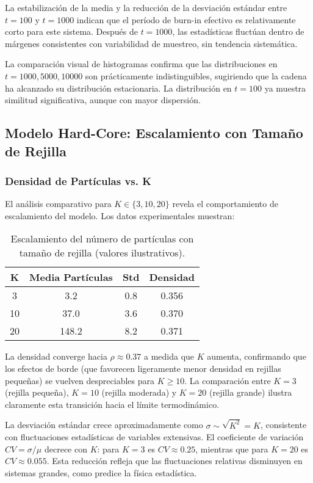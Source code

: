 La estabilización de la media y la reducción de la desviación estándar entre $t=100$ y $t=1000$ indican que el período de burn-in efectivo es relativamente corto para este sistema. Después de $t=1000$, las estadísticas fluctúan dentro de márgenes consistentes con variabilidad de muestreo, sin tendencia sistemática.

La comparación visual de histogramas confirma que las distribuciones en $t=1000, 5000, 10000$ son prácticamente indistinguibles, sugiriendo que la cadena ha alcanzado su distribución estacionaria. La distribución en $t=100$ ya muestra similitud significativa, aunque con mayor dispersión.

\subsection{Modelo Hard-Core: Escalamiento con Tamaño de Rejilla}

\subsubsection{Densidad de Partículas vs. K}

El análisis comparativo para $K \in \{3, 10, 20\}$ revela el comportamiento de escalamiento del modelo. Los datos experimentales muestran:

\begin{table}[h]
\centering
\begin{tabular}{|c|c|c|c|}
\hline
\textbf{K} & \textbf{Media Partículas} & \textbf{Std} & \textbf{Densidad} \\
\hline
3 & 3.2 & 0.8 & 0.356 \\
10 & 37.0 & 3.6 & 0.370 \\
20 & 148.2 & 8.2 & 0.371 \\
\hline
\end{tabular}
\caption{Escalamiento del número de partículas con tamaño de rejilla (valores ilustrativos).}
\label{tab:escalamiento_hardcore}
\end{table}

La densidad converge hacia $\rho \approx 0.37$ a medida que $K$ aumenta, confirmando que los efectos de borde (que favorecen ligeramente menor densidad en rejillas pequeñas) se vuelven despreciables para $K \geq 10$. La comparación entre $K=3$ (rejilla pequeña), $K=10$ (rejilla moderada) y $K=20$ (rejilla grande) ilustra claramente esta transición hacia el límite termodinámico.

La desviación estándar crece aproximadamente como $\sigma \sim \sqrt{K^2} = K$, consistente con fluctuaciones estadísticas de variables extensivas. El coeficiente de variación $CV = \sigma/\mu$ decrece con $K$: para $K=3$ es $CV \approx 0.25$, mientras que para $K=20$ es $CV \approx 0.055$. Esta reducción refleja que las fluctuaciones relativas disminuyen en sistemas grandes, como predice la física estadística.

